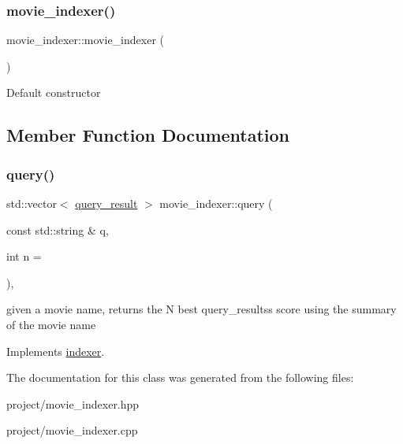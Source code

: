 \subsubsection{\texorpdfstring{movie\+\_\+indexer()}{movie\_indexer()}}
{\footnotesize\ttfamily movie\+\_\+indexer\+::movie\+\_\+indexer (\begin{DoxyParamCaption}{ }\end{DoxyParamCaption})}

Default constructor 

\subsection{Member Function Documentation}
\mbox{\label{classmovie__indexer_ac41cf13705a275a39a0fae8d6e9fd9d5}} 
\subsubsection{\texorpdfstring{query()}{query()}}
{\footnotesize\ttfamily std\+::vector$<$ \hyperlink{classquery__result}{query\+\_\+result} $>$ movie\+\_\+indexer\+::query (\begin{DoxyParamCaption}\item[{const std\+::string \&}]{q,  }\item[{int}]{n = {} }\end{DoxyParamCaption})\hspace{0.3cm}{\ttfamily [override]}, {\ttfamily [virtual]}}

given a movie name, returns the N best query\+\_\+results\textquotesingle{}s score using the summary of the movie name 

Implements \hyperlink{classindexer}{indexer}.



The documentation for this class was generated from the following files\+:\begin{DoxyCompactItemize}
\item 
project/movie\+\_\+indexer.\+hpp\item 
project/movie\+\_\+indexer.\+cpp\end{DoxyCompactItemize}
